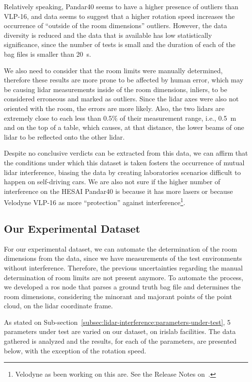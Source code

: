 Relatively speaking, Pandar40 seems to have a higher presence of outliers than VLP-16, and data seems to suggest that a higher rotation speed increases the occurrence of ``outside of the room dimensions'' outliers. However, the data diversity is reduced and the data that is available has low statistically significance, since the number of tests is small and the duration of each of the bag files is smaller than \SI{20}{\second}.

We also need to consider that the room limits were manually determined, therefore these results are more prone to be affected by human error, which may be causing \ac{lidar} measurements inside of the room dimensions, inliers, to be considered erroneous and marked as outliers. Since the \ac{lidar} axes were also not oriented with the room, the errors are more likely. Also, the two \acp{lidar} are extremely close to each less than 0.5\% of their measurement range, i.e., \SI{0.5}{\meter} and on the top of a table, which causes, at that distance, the lower beams of one \ac{lidar} to be reflected onto the other \ac{lidar}. 

Despite no conclusive verdicts can be extracted from this data, we can affirm that the conditions under which this dataset is taken fosters the occurrence of mutual \ac{lidar} interference, biasing the data by creating laboratories scenarios difficult to happen on self-driving cars. We are also not sure if the higher number of interference on the HESAI Pandar40 is because it has more lasers or because Velodyne VLP-16 as more ``protection'' against interference\footnote{Velodyne as been working on this are. See the Release Notes on~\cite{vlp16}.}. 

\subsection{Our Experimental Dataset}
\label{subsec:lidar-interference:our-experimental-dataset}
For our experimental dataset, we can automate the determination of the room dimensions from the data, since we have measurements of the test environments without interference. Therefore, the previous uncertainties regarding the manual determination of room limits are not present anymore. To automate the process, we developed a \ac{ros} node that parses a ground truth bag file and determines the room dimensions, considering the minorant and majorant points of the point cloud, on the \ac{lidar} coordinate frame. 

As stated on Sub-section~\ref{subsec:lidar-interference:parameters-under-test}, 5 parameters under test are varied on our dataset, on \ac{irislab} facilities. The data gathered is analyzed and the results, for each of the parameters, are presented below, with the exception of the rotation speed.


